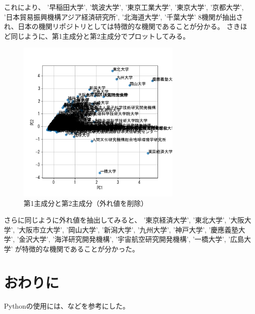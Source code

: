 \documentclass[submit,noauthor]{ono}
\begin{document}
これにより、
'早稲田大学', '筑波大学', '東京工業大学', '東京大学', '京都大学', '日本貿易振興機構アジア経済研究所', '北海道大学', '千葉大学'
8機関が抽出され、日本の機関リポジトリとしては特徴的な機関であることが分かる。
さきほど同じように、第1主成分と第2主成分でプロットしてみる。
\begin{figure}[h]
	\includegraphics[width=8cm]{./picture/pc1pc2_outlier.png}
	\caption{第1主成分と第2主成分（外れ値を削除）}
	\label{fig:pc1pc2_outlier}
\end{figure}

さらに同じように外れ値を抽出してみると、
'東京経済大学', '東北大学', '大阪大学', '大阪市立大学', '岡山大学', '新潟大学', '九州大学', '神戸大学', '慶應義塾大学', '金沢大学', '海洋研究開発機構', '宇宙航空研究開発機構', '一橋大学', '広島大学'
が特徴的な機関であることが分かった。

\section{おわりに}
Pythonの使用には、\cite{book1}などを参考にした。

\end{document}
